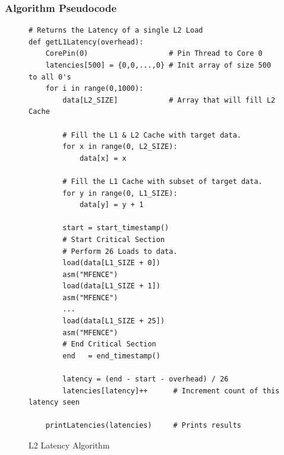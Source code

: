 \documentclass[bsc,frontabs,twoside,singlespacing,parskip,deptreport]{infthesis}     %
\begin{document}
\subsubsection{Algorithm Pseudocode}
\begin{figure}[h!]
    \begin{verbatim}
# Returns the Latency of a single L2 Load
def getL1Latency(overhead):
    CorePin(0)                   # Pin Thread to Core 0
    latencies[500] = {0,0,...,0} # Init array of size 500 to all 0's
    for i in range(0,1000):
        data[L2_SIZE]            # Array that will fill L2 Cache
        
        # Fill the L1 & L2 Cache with target data.
        for x in range(0, L2_SIZE):
            data[x] = x
        
        # Fill the L1 Cache with subset of target data.
        for y in range(0, L1_SIZE):
            data[y] = y + 1
            
        start = start_timestamp()
        # Start Critical Section
        # Perform 26 Loads to data.
        load(data[L1_SIZE + 0])
        asm("MFENCE")
        load(data[L1_SIZE + 1])
        asm("MFENCE")
        ...
        load(data[L1_SIZE + 25])
        asm("MFENCE")
        # End Critical Section
        end   = end_timestamp()
        
        latency = (end - start - overhead) / 26
        latencies[latency]++      # Increment count of this latency seen
        
    printLatencies(latencies)     # Prints results
    \end{verbatim}
    \caption{L2 Latency Algorithm}
    \label{fig:l2-lat-algo}
\end{figure}
\end{document}

